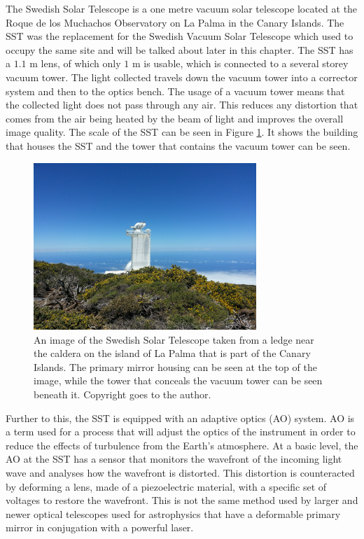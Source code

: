 	The Swedish Solar Telescope is a one metre vacuum solar telescope located at the Roque de los Muchachos Observatory on La Palma in the Canary Islands.
	The SST was the replacement for the Swedish Vacuum Solar Telescope which used to occupy the same site and will be talked about later in this chapter.
	The SST has a $1.1$ m lens, of which only $1$ m is usable, which is connected to a several storey vacuum tower. 
    The light collected travels down the vacuum tower into a corrector system and then to the optics bench. 
    The usage of a vacuum tower means that the collected light does not pass through any air.
    This reduces any distortion that comes from the air being heated by the beam of light  and improves the overall image quality. 
    The scale of the SST can be seen in Figure \ref{fig:SST}.
    It shows the building that houses the SST and the tower that contains the vacuum tower can be seen.    
	\begin{figure}
        \centering
        \includegraphics[width=0.75\textwidth]{SST.jpg}
        \caption{
            An image of the Swedish Solar Telescope taken from a ledge near the caldera on the island of La Palma that is part of the Canary Islands.
            The primary mirror housing can be seen at the top of the image, while the tower that conceals the vacuum tower can be seen beneath it.
            Copyright goes to the author.
           }
           \label{fig:SST}
   \end{figure}
         
    Further to this, the SST is equipped with an adaptive optics (AO) system. 
	AO is a term used for a process that will adjust the optics of the instrument in order to reduce the effects of turbulence from the Earth's atmosphere. 
	At a basic level, the AO at the SST has a sensor that monitors the wavefront of the incoming light wave and analyses how the wavefront is distorted.
	This distortion is counteracted by deforming a lens, made of a piezoelectric material, with a specific set of voltages to restore the wavefront.
	This is not the same method used by larger and newer optical telescopes used for astrophysics that have a deformable primary mirror in conjugation with a powerful laser.
	
